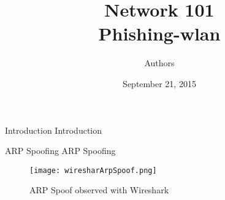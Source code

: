 \documentclass{beamer}
\title[Phishing-Wlan]{Network 101\\Phishing-wlan}
\author{Authors}
\institute{Institute}
\date{September 21, 2015}
\begin{document}
\begin{frame}
\titlepage
\end{frame}


\begin{frame}{Introduction}
	Introduction\\
\end{frame}

\begin{frame}{ARP Spoofing}
	ARP Spoofing \\	
 	\begin{figure}[h]
 		\centering
   		\texttt{[image: wiresharArpSpoof.png]}
   		\caption{ARP Spoof observed with Wireshark}
	\end{figure}
	
\end{frame}
\end{document}
